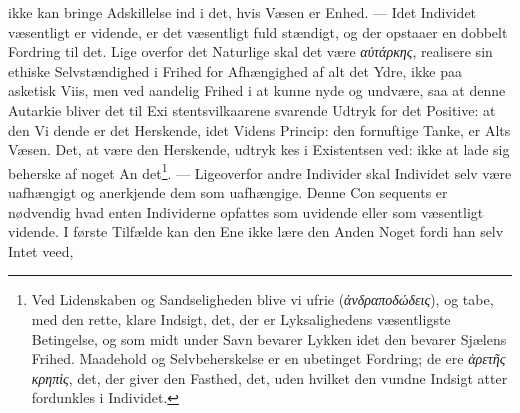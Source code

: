 \documentclass[12pt,a4paper]{book}
\newcommand{\gk}[1]{\textit{#1}}
\begin{document}
ikke kan bringe Adskillelse ind i det, hvis Væsen er Enhed.
--- Idet Individet væsentligt er vidende, er det væsentligt fuld\-%
stændigt, og der opstaaer en dobbelt Fordring til det. Lige\-%
overfor det Naturlige skal det være \gk{αὐτάρκης}, realisere sin
ethiske Selvstændighed i Frihed for Afhængighed af alt det Ydre,
ikke paa asketisk Viis, men ved aandelig Frihed i at kunne
nyde og undvære, saa at denne Autarkie bliver det til Exi\-%
stentsvilkaarene svarende Udtryk for det Positive: at den Vi\-%
dende er det Herskende, idet Videns Princip: den fornuftige
Tanke, er Alts Væsen. Det, at være den Herskende, udtryk\-%
kes i Existentsen ved: ikke at lade sig beherske af noget An\-%
det\footnote{Ved Lidenskaben og Sandseligheden blive vi ufrie (\gk{ἀνδραποδώδεις}),
og tabe, med den rette, klare Indsigt, det, der er Lyksalighedens
væsentligste Betingelse, og som midt under Savn bevarer Lykken
idet den bevarer Sjælens Frihed. Maadehold og Selvbeherskelse er
en ubetinget Fordring; de ere \gk{ἀρετῆς κρηπὶς}, det, der giver den
Fasthed, det, uden hvilket den vundne Indsigt atter fordunkles i
Individet.}. --- Ligeoverfor andre Individer skal Individet selv være
uafhængigt og anerkjende dem som uafhængige. Denne Con\-%
sequents er nødvendig hvad enten Individerne opfattes som
uvidende eller som væsentligt vidende. I første Tilfælde kan
den Ene ikke lære den Anden Noget fordi han selv Intet veed,
\end{document}
